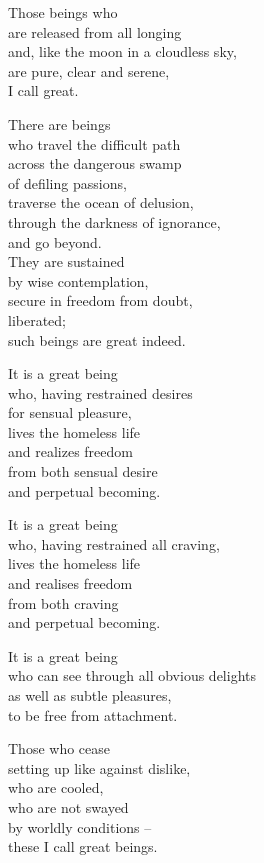 Those beings who\\
are released from all longing\\
and, like the moon in a cloudless sky,\\
are pure, clear and serene,\\
I call great.


There are beings\\
who travel the difficult path\\
across the dangerous swamp\\
of defiling passions,\\
traverse the ocean of delusion,\\
through the darkness of ignorance,\\
and go beyond.\\
They are sustained\\
by wise contemplation,\\
secure in freedom from doubt,\\
liberated;\\
such beings are great indeed.


It is a great being\\
who, having restrained desires\\
for sensual pleasure,\\
lives the homeless life\\
and realizes freedom\\
from both sensual desire\\
and perpetual becoming.


It is a great being\\
who, having restrained all craving,\\
lives the homeless life\\
and realises freedom\\
from both craving\\
and perpetual becoming.


It is a great being\\
who can see through all obvious delights\\
as well as subtle pleasures,\\
to be free from attachment.


Those who cease\\
setting up like against dislike,\\
who are cooled,\\
who are not swayed\\
by worldly conditions --\\
these I call great beings.


